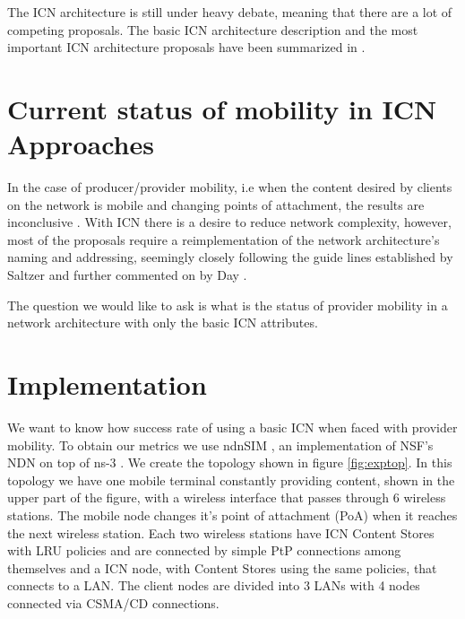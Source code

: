 \documentclass[8pt,twocolumn]{article}
\begin{document}
The ICN architecture is still under heavy debate, meaning that there are a lot
of competing proposals. 
The basic ICN architecture description and the most important ICN architecture
proposals have been summarized in \cite{6563278}. 

\section{Current status of mobility in ICN Approaches}


In the case of producer/provider mobility, i.e when the content desired by
clients on the network is mobile and changing points of attachment, the results
are inconclusive \cite{Tyson:2012:SMI:2248361.2248363}. With ICN there is a 
desire to reduce network complexity, however, most of the proposals require a
reimplementation of the network architecture's naming and addressing, seemingly
closely following the guide lines established by Saltzer 
\cite{saltzer:namingandbindingnetworks} and further commented on by Day
\cite{Day:2008:PNA:1349793}. 


The question we would like to ask is what is
the status of provider mobility in a network architecture with only the basic
ICN attributes.

\section{Implementation}
We want to know how success rate of using a basic ICN when faced with provider
mobility. To obtain our metrics we use ndnSIM \cite{ndn367}, an implementation
of NSF's NDN \cite{nsfndn:2014:Online} on top of ns-3 \cite{ns3:2014:Online}.
We create the topology shown in figure \ref{fig:exptop}.  In this topology we
have one mobile terminal constantly providing content, shown in the upper part
of the figure, with a wireless interface that passes through 6 wireless stations.
The mobile node changes it's point of attachment (PoA) when it reaches the next
wireless station. Each two wireless stations have ICN Content Stores with LRU
policies and are connected by simple PtP connections among themselves and a ICN
node, with Content Stores using the same policies, that connects to a LAN. The
client nodes are divided into 3 LANs with 4 nodes connected via CSMA/CD connections. 
\end{document}
